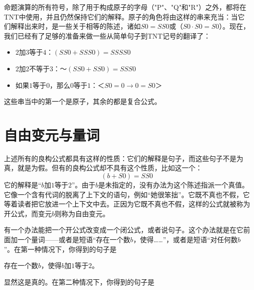 命题演算的所有符号，除了用于构成原子的字母（"P"、"Q"和"R"）之外，都将在TNT中使用，并且仍然保持它们的解释。原子的角色将由这样的串来充当：当它们解释出来时，是一些关于相等的陈述，诸如$S0=SS0$或（$S0\cdot S0=S0$）。现在，我们已经有了足够的准备来做一些从简单句子到TNT记号的翻译了：
\begin{itemize}
\item $2$加$3$等于$4$：$(SS0+SSS0)=SSSS0$
\item $2$加$2$不等于$3$：$～(SS0+SS0)=SSS0$
\item 如果$1$等于$0$，那么$0$等于$1$：$＜S0=0→0=S0＞$
\end{itemize}
这些串当中的第一个是原子，其余的都是复合公式。

\section{自由变元与量词}

上述所有的良构公式都具有这样的性质：它们的解释是句子，而这些句子不是为真，就是为假。但有的良构公式却不具有这个性质，比如这一个：
\[
(b+S0)=SS0
\]
它的解释是“$b$加$1$等于$2$”。由于$b$是未指定的，没有办法为这个陈述指派一个真值。它像一个含有代词的脱离了上下文的语句，例如“她很笨拙”。它既不真也不假，它等着读者把它放进一个上下文中去。正因为它既不真也不假，这样的公式就被称为开公式，而变元$b$则称为自由变元。

有一个办法能把一个开公式改变成一个闭公式，或者说句子。这个办法就是在它前面加一个量词——或者是短语“存在一个数$b$，使得……”，或者是短语“对任何数$b$”。在第一种情况下，你得到的句子是

\begin{block}
存在一个数$b$，使得$b$加$1$等于$2$。
\end{block}
显然这是真的。在第二种情况下，你得到的句子是

